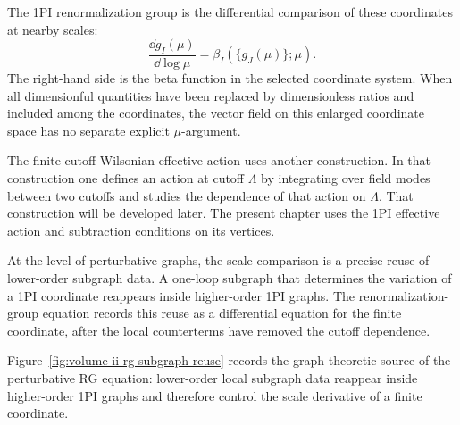 The 1PI renormalization group is the differential comparison of these
coordinates at nearby scales:
\[
  \frac{\dd g_I(\mu)}{\dd\log\mu}
  =
  \beta_I(\{g_J(\mu)\};\mu).
\]
The right-hand side is the beta function in the selected coordinate system.
When all dimensionful quantities have been replaced by dimensionless ratios
and included among the coordinates, the vector field on this enlarged
coordinate space has no separate explicit \(\mu\)-argument.

The finite-cutoff Wilsonian effective action uses another construction.  In
that construction one defines an action at cutoff \(\Lambda\) by integrating
over field modes between two cutoffs and studies the dependence of that action
on \(\Lambda\).  That construction will be developed later.  The present
chapter uses the 1PI effective action and subtraction conditions on its
vertices.

At the level of perturbative graphs, the scale comparison is a precise reuse
of lower-order subgraph data.  A one-loop subgraph that determines the
variation of a 1PI coordinate reappears inside higher-order 1PI graphs.  The
renormalization-group equation records this reuse as a differential equation
for the finite coordinate, after the local counterterms have removed the
cutoff dependence.

Figure~\ref{fig:volume-ii-rg-subgraph-reuse} records the graph-theoretic source
of the perturbative RG equation: lower-order local subgraph data reappear inside
higher-order 1PI graphs and therefore control the scale derivative of a finite
coordinate.

